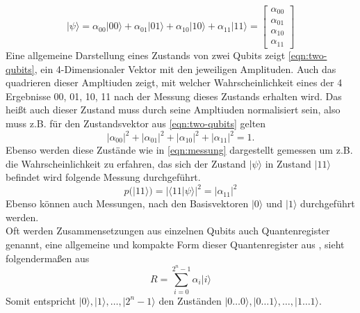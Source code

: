 \begin{equation}\label{eqn:two-qubits}
|\psi \rangle = \alpha_{00} |00\rangle + \alpha_{01} |01\rangle + \alpha_{10} |10\rangle + \alpha_{11} |11\rangle = \begin{bmatrix} \alpha_{00} \\ \alpha_{01} \\ \alpha_{10} \\ \alpha_{11} \end{bmatrix}
\end{equation}
Eine allgemeine Darstellung eines Zustands von zwei Qubits zeigt \ref{eqn:two-qubits}, ein 4-Dimensionaler Vektor mit den jeweiligen Amplituden. Auch das quadrieren dieser Ampltiuden zeigt, mit welcher Wahrscheinlichkeit eines der 4 Ergebnisse 00, 01, 10, 11 nach der Messung dieses Zustands erhalten wird.
Das hei\ss t auch dieser Zustand muss durch seine Ampltiuden normalisiert sein, also muss z.B. f\"ur den Zustandsvektor aus \ref{eqn:two-qubits} gelten
\begin{equation}
|\alpha_{00}|^2+|\alpha_{01}|^2+|\alpha_{10}|^2+|\alpha_{11}|^2 = 1 .
\end{equation}
Ebenso werden diese Zust\"ande wie in \ref{eqn:messung} dargestellt gemessen um z.B. die Wahrscheinlichkeit zu erfahren, das sich der Zustand $|\psi \rangle$ in Zustand $|11\rangle$ befindet wird folgende Messung durchgef\"uhrt.
\begin{equation}
p(|11\rangle) = |\langle 11| \psi  \rangle|^2 = |\alpha_{11}|^2
\end{equation}
Ebenso k\"onnen auch Messungen, nach den Basisvektoren $|0 \rangle$ und $| 1\rangle$ durchgef\"uhrt werden.
\\
Oft werden Zusammensetzungen aus einzelnen Qubits auch Quantenregister genannt, eine allgemeine und kompakte Form dieser Quantenregister aus \cite{Homeister-2022}, sieht folgenderma\ss en aus
\begin{equation}
R = \sum\limits_{i=0}^{2^{n}-1} \alpha_i |i\rangle
\end{equation}
Somit entspricht $|0\rangle, |1\rangle, \dots, |2^{n}-1\rangle$ den Zust\"anden $|0\dots 0\rangle, |0\dots 1\rangle, \dots, |1\dots 1\rangle$.
